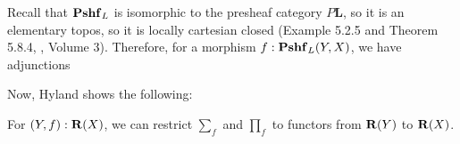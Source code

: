 Recall that $ \mathbf{Pshf}_{L} $ is isomorphic to the presheaf category $ P \mathbf L $, so it is an elementary topos, so it is locally cartesian closed (Example 5.2.5 and Theorem 5.8.4, \cite{borceux}, Volume 3). Therefore, for a morphism $ f: \mathbf{Pshf}_{L}(Y, X) $, we have adjunctions
\begin{center}
\end{center}

Now, Hyland shows the following:
\begin{theorem}\label{thm:restrict-sum-product}
  For $ (Y, f) : \mathbf{R}(X) $, we can restrict $ \sum_f $ and $ \prod_f $ to functors from $ \mathbf{R}(Y) $ to $ \mathbf{R}(X) $.
\end{theorem}
